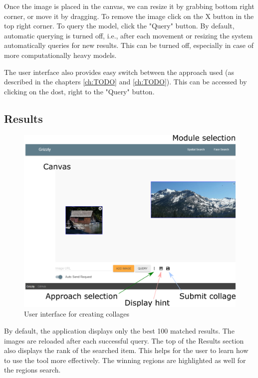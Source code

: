 Once the image is placed in the canvas, we can resize it by grabbing bottom right corner, or move it by dragging. To remove the image click on the X button in the top right corner. To query the model, click the "Query" button. By default, automatic querying is turned off, i.e., after each movement or resizing the system automatically queries for new results. This can be turned off, especially in case of more computationally heavy models.

The user interface also provides easy switch between the approach used (as described in the chapters \ref{ch:TODO} and \ref{ch:TODO}). \todo{} This can be accessed by clicking on the dost, right to the "Query" button. 

\subsection*{Results}

\begin{figure}
    \centering
    \includegraphics[width=\linewidth]{img/spatial_ui.pdf}
    \caption{User interface for creating collages}
    \label{fig:ui_collage}
\end{figure}

By default, the application displays only the best 100 matched results. The images are reloaded after each successful query. The top of the Results section also displays the rank of the searched item. This helps for the user to learn how to use the tool more effectively. The winning regions are highlighted as well for the regions search.

